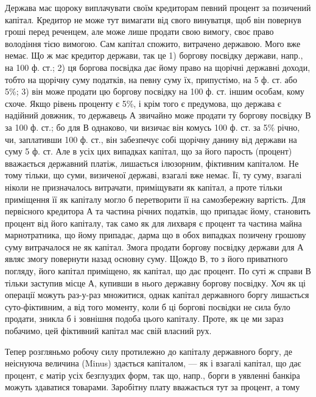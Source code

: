 Держава має щороку виплачувати своїм кредиторам певний процент за
позичений капітал. Кредитор не може тут вимагати від свого винуватця, щоб він
повернув гроші перед реченцем, але може лише продати свою вимогу, своє
право володіння тією вимогою. Сам капітал спожито, витрачено державою. Мого
вже немає. Що ж має кредитор держави, так це 1) боргову посвідку держави,
напр., на 100 ф. ст.; 2) ця боргова посвідка дає йому право на щорічні
державні доходи, тобто на щорічну суму податків, на певну суму їх, припустімо,
на 5 ф. ст. або 5\%; 3) він може продати цю боргову посвідку на 100 ф. ст.
іншим особам, кому схоче. Якщо рівень проценту є 5\%, і крім того є предумова,
що держава є надійний довжник, то державець А звичайно може продати ту боргову
посвідку В за 100 ф. ст.; бо для В однаково, чи визичає він комусь 100 ф. ст.
за 5\% річно, чи, заплативши 100 ф. ст., він забезпечує собі щорічну данину
від держави на суму 5 ф. ст. Але в усіх цих випадках капітал, що за його
парость (процент) вважається державний платіж, лишається ілюзорним, фіктивним
капіталом. Не тому тільки, що суми, визиченої державі, взагалі вже немає.
Її, ту суму, взагалі ніколи не призначалось витрачати, приміщувати як капітал,
а проте тільки приміщення її як капіталу могло б перетворити її на самозбережну
вартість. Для первісного кредитора А та частина річних податків, що припадає
йому, становить процент від його капіталу, так само як для лихваря є процент
та частина майна марнотратника, що йому припадає, дарма що в обох випадках
позичену грошову суму витрачалося не як капітал. Змога продати боргову
посвідку держави для А являє змогу повернути назад основну суму. Щождо В,
то з його приватного погляду, його капітал приміщено, як капітал, що дає
процент. По суті ж справи В тільки заступив місце А, купивши в нього
державну боргову посвідку. Хоч як ці операції можуть раз-у-раз множитися,
однак капітал державного боргу лишається суто-фіктивним, а від того моменту,
коли б ці боргові посвідки не сила було продати, зникла б і зовнішня подоба
цього капіталу. Проте, як це ми зараз побачимо, цей фіктивний капітал
має свій власний рух.

Тепер розгляньмо робочу силу протилежно до капіталу державного боргу,
де неіснуюча величина (Minus) здається капіталом, — як і взагалі капітал, що дає
процент, є матір усіх безглуздих форм, так що, напр., борги в уявленні банкіра
можуть здаватися товарами. Заробітну плату вважається тут за процент, а тому
